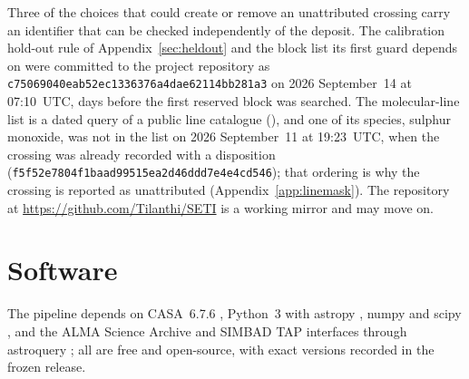 Three of the choices that could create or remove an unattributed crossing
carry an identifier that can be checked independently of the deposit. The
calibration hold-out rule of Appendix~\ref{sec:heldout} and the block list
its first guard depends on were committed to the project repository as
\texttt{c75069040eab52ec1336376a4dae62114bb281a3} on 2026 September~14 at
07:10~UTC, \HoLeadBlockDays{} days before the first reserved block was
searched. The molecular-line list is a dated query of a public line
catalogue (\McQueryDate), and one of its species, sulphur monoxide, was not
in the list on 2026 September~11 at 19:23~UTC, when the \FrCpStar{}
crossing was already recorded with a disposition
(\texttt{f5f52e7804f1baad99515ea2d46ddd7e4e4cd546}); that ordering is why
the crossing is reported as unattributed
(Appendix~\ref{app:linemask}). The repository at
\url{https://github.com/Tilanthi/SETI} is a working mirror and may move on.

\section*{Software}
The pipeline depends on CASA~6.7.6 \citep[casatools/casatasks
6.7.6-14;][]{CASA2022}, Python~3 with astropy \citep{Astropy2022}, numpy
\citep{Harris2020} and scipy \citep{Virtanen2020}, and the ALMA Science
Archive and SIMBAD TAP interfaces through astroquery \citep{Ginsburg2019};
all are free and open-source, with exact
versions recorded in the frozen release.
